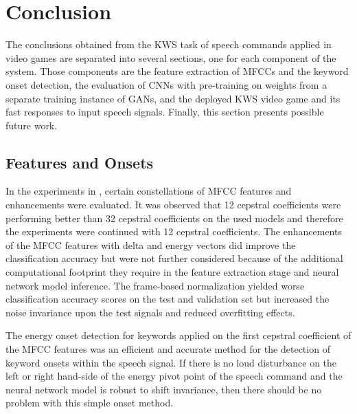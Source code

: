 
\chapter{Conclusion}\label{sec:conclusion}
The conclusions obtained from the KWS task of speech commands applied in video games are separated into several sections, one for each component of the system.
Those components are the feature extraction of MFCCs and the keyword onset detection, the evaluation of CNNs with pre-training on weights from a separate training instance of GANs, and the deployed KWS video game and its fast responses to input speech signals.
Finally, this section presents possible future work.



\section{Features and Onsets}
In the experiments in , certain constellations of MFCC features and enhancements were evaluated.
It was observed that 12 cepstral coefficients were performing better than 32 cepstral coefficients on the used models and therefore the experiments were continued with 12 cepstral coefficients.
The enhancements of the MFCC features with delta and energy vectors did improve the classification accuracy but were not further considered because of the additional computational footprint they require in the feature extraction stage and neural network model inference.
The frame-based normalization yielded worse classification accuracy scores on the test and validation set but increased the noise invariance upon the test signals and reduced overfitting effects.

The energy onset detection for keywords applied on the first cepstral coefficient of the MFCC features was an efficient and accurate method for the detection of keyword onsets within the speech signal.
If there is no loud disturbance on the left or right hand-side of the energy pivot point of the speech command and the neural network model is robust to shift invariance, then there should be no problem with this simple onset method.



